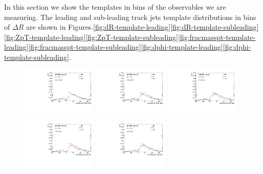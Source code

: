 \label{sec:gbb-app-sd0templates}
In this section we show the \subsdzero templates in bins of the observables we are measuring. The leading and sub-leading track jets template \subsdzero distributions in bins of $\Delta R$ are shown in Figures.\ref{fig:dR-template-leading}\ref{fig:dR-template-subleading}\ref{fig:ZpT-template-leading}\ref{fig:ZpT-template-subleading}\ref{fig:fracmasspt-template-leading}\ref{fig:fracmasspt-template-subleading}\ref{fig:dphi-template-leading}\ref{fig:dphi-template-subleading}.

\begin{figure}[htbp]
  \centering
 \includegraphics[width=0.32\textwidth]{figures/gbb/Sub_Sd0_Fits/Canv_FitTemplate_02-DeltaR-025_LpT_INF_SpT_INF_x.pdf}
 \includegraphics[width=0.32\textwidth]{figures/gbb/Sub_Sd0_Fits/Canv_FitTemplate_025-DeltaR-03_LpT_INF_SpT_INF_x.pdf}
 \includegraphics[width=0.32\textwidth]{figures/gbb/Sub_Sd0_Fits/Canv_FitTemplate_03-DeltaR-04_LpT_INF_SpT_INF_x.pdf}\\
 \includegraphics[width=0.32\textwidth]{figures/gbb/Sub_Sd0_Fits/Canv_FitTemplate_04-DeltaR-05_LpT_INF_SpT_INF_x.pdf}
 \includegraphics[width=0.32\textwidth]{figures/gbb/Sub_Sd0_Fits/Canv_FitTemplate_05-DeltaR-06_LpT_INF_SpT_INF_x.pdf}

\end{figure}
